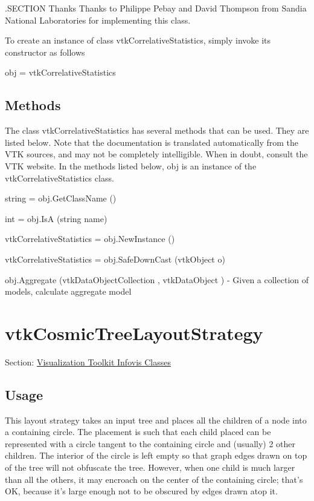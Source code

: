 .S\-E\-C\-T\-I\-O\-N Thanks Thanks to Philippe Pebay and David Thompson from Sandia National Laboratories for implementing this class.

To create an instance of class vtk\-Correlative\-Statistics, simply invoke its constructor as follows \begin{DoxyVerb}  obj = vtkCorrelativeStatistics
\end{DoxyVerb}
 \hypertarget{vtkwidgets_vtkxyplotwidget_Methods}{}\subsection{Methods}\label{vtkwidgets_vtkxyplotwidget_Methods}
The class vtk\-Correlative\-Statistics has several methods that can be used. They are listed below. Note that the documentation is translated automatically from the V\-T\-K sources, and may not be completely intelligible. When in doubt, consult the V\-T\-K website. In the methods listed below, {\ttfamily obj} is an instance of the vtk\-Correlative\-Statistics class. 
\begin{DoxyItemize}
\item {\ttfamily string = obj.\-Get\-Class\-Name ()}  
\item {\ttfamily int = obj.\-Is\-A (string name)}  
\item {\ttfamily vtk\-Correlative\-Statistics = obj.\-New\-Instance ()}  
\item {\ttfamily vtk\-Correlative\-Statistics = obj.\-Safe\-Down\-Cast (vtk\-Object o)}  
\item {\ttfamily obj.\-Aggregate (vtk\-Data\-Object\-Collection , vtk\-Data\-Object )} -\/ Given a collection of models, calculate aggregate model  
\end{DoxyItemize}\hypertarget{vtkinfovis_vtkcosmictreelayoutstrategy}{}\section{vtk\-Cosmic\-Tree\-Layout\-Strategy}\label{vtkinfovis_vtkcosmictreelayoutstrategy}
Section\-: \hyperlink{sec_vtkinfovis}{Visualization Toolkit Infovis Classes} \hypertarget{vtkwidgets_vtkxyplotwidget_Usage}{}\subsection{Usage}\label{vtkwidgets_vtkxyplotwidget_Usage}
This layout strategy takes an input tree and places all the children of a node into a containing circle. The placement is such that each child placed can be represented with a circle tangent to the containing circle and (usually) 2 other children. The interior of the circle is left empty so that graph edges drawn on top of the tree will not obfuscate the tree. However, when one child is much larger than all the others, it may encroach on the center of the containing circle; that's O\-K, because it's large enough not to be obscured by edges drawn atop it.

